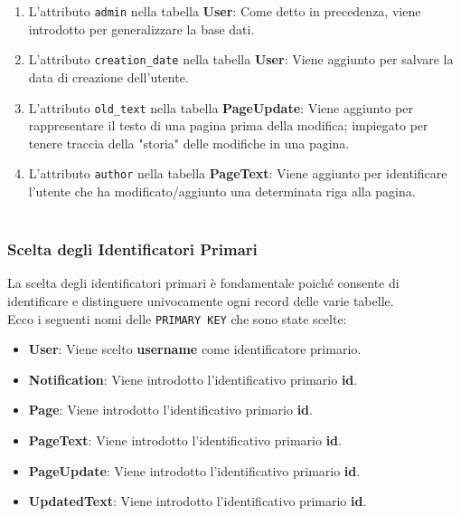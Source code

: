 \documentclass{article}
\begin{document}
	\begin{enumerate}
		\item L'attributo \texttt{admin} nella tabella \textbf{User}: Come detto in precedenza, viene introdotto per generalizzare la base dati.
		\item L'attributo \texttt{creation\_date} nella tabella \textbf{User}: Viene aggiunto per salvare la data di creazione dell'utente.
		\item L'attributo \texttt{old\_text} nella tabella \textbf{PageUpdate}: Viene aggiunto per rappresentare il testo di una pagina prima della modifica; impiegato per tenere traccia della "storia" delle modifiche in una pagina.
		\item L'attributo \texttt{author} nella tabella \textbf{PageText}: Viene aggiunto per identificare l'utente che ha modificato/aggiunto una determinata riga alla pagina.
		\\\\
	\end{enumerate}
	 
	
	\subsubsection{Scelta degli Identificatori Primari}
	La scelta degli identificatori primari è fondamentale poiché consente di identificare e distinguere univocamente ogni record delle varie tabelle.
	\\
	Ecco i seguenti nomi delle \texttt{PRIMARY KEY} che sono state scelte:
	\\
	\begin{itemize}
		\item \textbf{User}: Viene scelto \textbf{username} come identificatore primario.
		\item \textbf{Notification}: Viene introdotto l'identificativo primario \textbf{id}.
		\item \textbf{Page}: Viene introdotto l'identificativo primario \textbf{id}.
		\item \textbf{PageText}: Viene introdotto l'identificativo primario \textbf{id}.
		\item \textbf{PageUpdate}: Viene introdotto l'identificativo primario \textbf{id}.
		\item \textbf{UpdatedText}: Viene introdotto l'identificativo primario \textbf{id}.
	\end{itemize}


	\newpage
\end{document}
